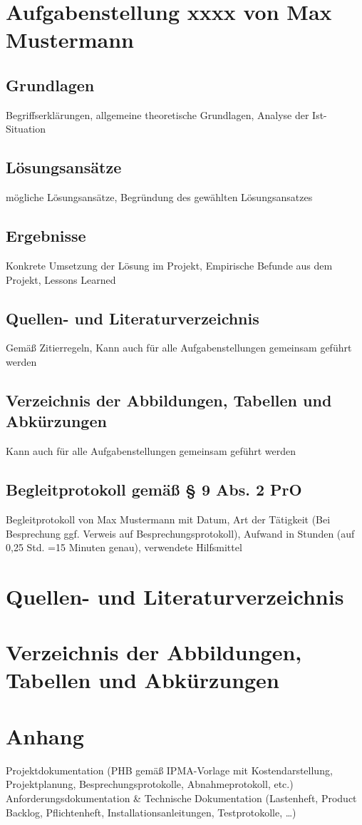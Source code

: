 \documentclass[letterpaper,10pt]{article}
\begin{document}
\pagebreak

\pagebreak

\section{Aufgabenstellung xxxx von Max Mustermann}
\subsection{Grundlagen}
Begriffserklärungen, allgemeine theoretische Grundlagen, Analyse der Ist-Situation
\subsection{Lösungsansätze}
mögliche Lösungsansätze, Begründung des gewählten Lösungsansatzes
\subsection{Ergebnisse}
Konkrete Umsetzung der Lösung im Projekt, Empirische Befunde aus dem Projekt, Lessons Learned
\subsection{Quellen- und Literaturverzeichnis}
Gemäß Zitierregeln, Kann auch für alle Aufgabenstellungen gemeinsam geführt werden
\subsection{Verzeichnis der Abbildungen, Tabellen und Abkürzungen}
Kann auch für alle Aufgabenstellungen gemeinsam geführt werden
\subsection{Begleitprotokoll gemäß § 9 Abs. 2 PrO}
Begleitprotokoll von Max Mustermann mit Datum, Art der Tätigkeit (Bei Besprechung ggf. Verweis auf Besprechungsprotokoll), Aufwand in Stunden (auf 0,25 Std. =15 Minuten genau), verwendete Hilfsmittel

\pagebreak

\section{Quellen- und Literaturverzeichnis}
\printbibliography


\pagebreak

\section{Verzeichnis der Abbildungen, Tabellen und Abkürzungen}

\listoffigures

\listoftables

\pagebreak

\section{Anhang}
Projektdokumentation (PHB gemäß IPMA-Vorlage mit Kostendarstellung, Projektplanung, Besprechungsprotokolle, Abnahmeprotokoll, etc.)
Anforderungsdokumentation \&  Technische Dokumentation (Lastenheft, Product Backlog, Pflichtenheft, Installationsanleitungen, Testprotokolle, …)
\end{document}
